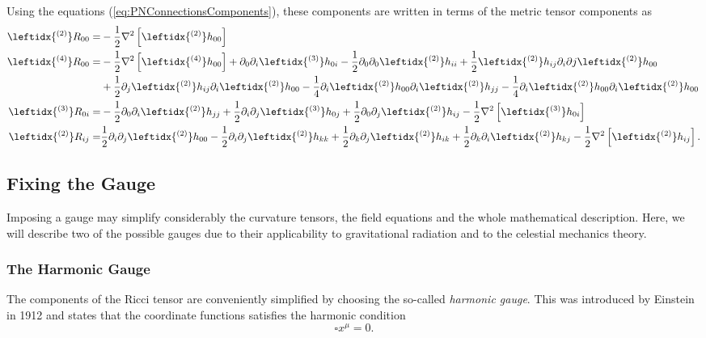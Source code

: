 Using the equations (\ref{eq:PNConnectionsComponents}), these components are written in terms of the metric tensor components as
\begin{subequations}\label{eq:1PNRicciTensorComponents}
\begin{align}
\leftidx{ ^{(2)}}R_{00} = &- \frac{1}{2} \nabla^2 \left[ \leftidx{ ^{(2)}} h_{00} \right] \\
\leftidx{ ^{(4)}}R_{00} = &- \frac{1}{2} \nabla^2 \left[ \leftidx{ ^{(4)}} h_{00} \right]+  \partial_0 \partial _i \leftidx{ ^{(3)}} h_{0i}  - \frac{1}{2} \partial_0 \partial_0 \leftidx{ ^{(2)}} h_{ii}  + \frac{1}{2} \leftidx{ ^{(2)}} h_{ij} \partial_i \partial j \leftidx{ ^{(2)}} h_{00} \notag \\ 
&+ \frac{1}{2}  \partial _j \leftidx{ ^{(2)}} h_{ij} \partial _i  \leftidx{ ^{(2)}} h_{00} - \frac{1}{4} \partial _i \leftidx{ ^{(2)}} h_{00}  \partial _i \leftidx{ ^{(2)}} h_{jj} -\frac{1}{4} \partial _i \leftidx{ ^{(2)}} h_{00}  \partial _i \leftidx{ ^{(2)}} h_{00} \\
\leftidx{ ^{(3)}}R_{0i} = & -\frac{1}{2} \partial_0 \partial_i \leftidx{ ^{(2)}} h_{jj} + \frac{1}{2} \partial_i \partial_j \leftidx{ ^{(3)}} h_{0j} + \frac{1}{2} \partial_0 \partial_j \leftidx{ ^{(2)}} h_{ij} - \frac{1}{2} \nabla^2 \left[ \leftidx{ ^{(3)}} h_{0i}\right]\\
\leftidx{ ^{(2)}}R_{ij} = & \frac{1}{2} \partial_i \partial_j \leftidx{ ^{(2)}} h_{00} - \frac{1}{2} \partial_i \partial_j \leftidx{ ^{(2)}} h_{kk} + \frac{1}{2} \partial_k \partial_j \leftidx{ ^{(2)}} h_{ik} + \frac{1}{2} \partial_k \partial_i \leftidx{ ^{(2)}} h_{kj} - \frac{1}{2} \nabla^2  \left[\leftidx{ ^{(2)}} h_{ij} \right].
\end{align}
\end{subequations}

\subsection{Fixing the Gauge}

Imposing a gauge may simplify considerably the curvature tensors, the field equations and the whole mathematical description. Here, we will describe two of the possible gauges due to their applicability to gravitational radiation and to the celestial mechanics theory.

\subsubsection{The Harmonic Gauge}
The components of the Ricci tensor are conveniently simplified by choosing the so-called \textit{harmonic gauge}. This was introduced by Einstein in 1912 \cite{Straumann2011}  and states that the coordinate functions satisfies the harmonic condition
\begin{equation}
\square x^\mu =0. \label{eq:HarmonicGauge}
\end{equation}

